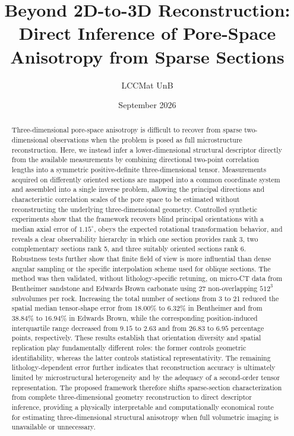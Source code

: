 \documentclass{article}
\title{Beyond 2D-to-3D Reconstruction: Direct Inference of Pore-Space Anisotropy from Sparse Sections}
\author{LCCMat UnB}
\date{September 2026}
\begin{document}
\maketitle

\begin{abstract}
Three-dimensional pore-space anisotropy is difficult to recover from sparse two-dimensional observations when the problem is posed as full microstructure reconstruction. Here, we instead infer a lower-dimensional structural descriptor directly from the available measurements by combining directional two-point correlation lengths into a symmetric positive-definite three-dimensional tensor. Measurements acquired on differently oriented sections are mapped into a common coordinate system and assembled into a single inverse problem, allowing the principal directions and characteristic correlation scales of the pore space to be estimated without reconstructing the underlying three-dimensional geometry. Controlled synthetic experiments show that the framework recovers blind principal orientations with a median axial error of $1.15^{\circ}$, obeys the expected rotational transformation behavior, and reveals a clear observability hierarchy in which one section provides rank 3, two complementary sections rank 5, and three suitably oriented sections rank 6. Robustness tests further show that finite field of view is more influential than dense angular sampling or the specific interpolation scheme used for oblique sections. The method was then validated, without lithology-specific retuning, on micro-CT data from Bentheimer sandstone and Edwards Brown carbonate using 27 non-overlapping $512^3$ subvolumes per rock. Increasing the total number of sections from 3 to 21 reduced the spatial median tensor-shape error from $18.00\%$ to $6.32\%$ in Bentheimer and from $38.84\%$ to $16.94\%$ in Edwards Brown, while the corresponding position-induced interquartile range decreased from $9.15$ to $2.63$ and from $26.83$ to $6.95$ percentage points, respectively. These results establish that orientation diversity and spatial replication play fundamentally different roles: the former controls geometric identifiability, whereas the latter controls statistical representativity. The remaining lithology-dependent error further indicates that reconstruction accuracy is ultimately limited by microstructural heterogeneity and by the adequacy of a second-order tensor representation. The proposed framework therefore shifts sparse-section characterization from complete three-dimensional geometry reconstruction to direct descriptor inference, providing a physically interpretable and computationally economical route for estimating three-dimensional structural anisotropy when full volumetric imaging is unavailable or unnecessary.
\end{abstract}
\end{document}
